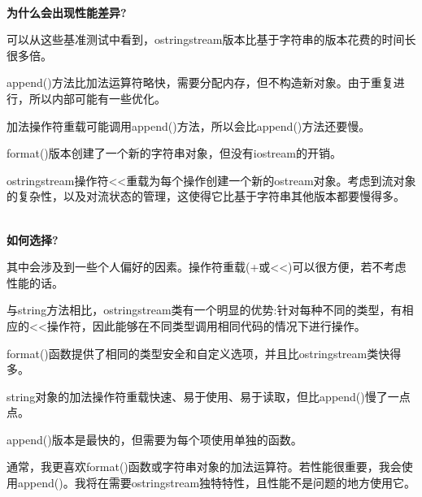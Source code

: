 \hspace*{\fill} \\ %
\noindent
\textbf{为什么会出现性能差异?}

可以从这些基准测试中看到，ostringstream版本比基于字符串的版本花费的时间长很多倍。

append()方法比加法运算符略快，需要分配内存，但不构造新对象。由于重复进行，所以内部可能有一些优化。

加法操作符重载可能调用append()方法，所以会比append()方法还要慢。

format()版本创建了一个新的字符串对象，但没有iostream的开销。

ostringstream操作符<{}<重载为每个操作创建一个新的ostream对象。考虑到流对象的复杂性，以及对流状态的管理，这使得它比基于字符串其他版本都要慢得多。

\hspace*{\fill} \\ %
\noindent
\textbf{如何选择?}

其中会涉及到一些个人偏好的因素。操作符重载(+或<{}<)可以很方便，若不考虑性能的话。

与string方法相比，ostringstream类有一个明显的优势:针对每种不同的类型，有相应的<{}<操作符，因此能够在不同类型调用相同代码的情况下进行操作。

format()函数提供了相同的类型安全和自定义选项，并且比ostringstream类快得多。

string对象的加法操作符重载快速、易于使用、易于读取，但比append()慢了一点点。

append()版本是最快的，但需要为每个项使用单独的函数。

通常，我更喜欢format()函数或字符串对象的加法运算符。若性能很重要，我会使用append()。我将在需要ostringstream独特特性，且性能不是问题的地方使用它。